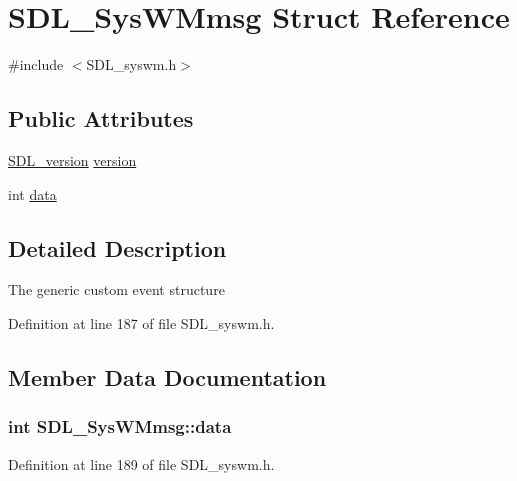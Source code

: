 \hypertarget{struct_s_d_l___sys_w_mmsg}{}\section{S\+D\+L\+\_\+\+Sys\+W\+Mmsg Struct Reference}
\label{struct_s_d_l___sys_w_mmsg}


{\ttfamily \#include $<$S\+D\+L\+\_\+syswm.\+h$>$}

\subsection*{Public Attributes}
\begin{DoxyCompactItemize}
\item 
\hyperlink{struct_s_d_l__version}{S\+D\+L\+\_\+version} \hyperlink{struct_s_d_l___sys_w_mmsg_a95f9aae58d18ee8fac556416b322a5fb}{version}
\item 
int \hyperlink{struct_s_d_l___sys_w_mmsg_ae2399a5ef24f5a1b39ad053c71ce5a43}{data}
\end{DoxyCompactItemize}


\subsection{Detailed Description}
The generic custom event structure 

Definition at line 187 of file S\+D\+L\+\_\+syswm.\+h.



\subsection{Member Data Documentation}
\hypertarget{struct_s_d_l___sys_w_mmsg_ae2399a5ef24f5a1b39ad053c71ce5a43}{}
\subsubsection[{data}]{\setlength{\rightskip}{0pt plus 5cm}int S\+D\+L\+\_\+\+Sys\+W\+Mmsg\+::data}\label{struct_s_d_l___sys_w_mmsg_ae2399a5ef24f5a1b39ad053c71ce5a43}


Definition at line 189 of file S\+D\+L\+\_\+syswm.\+h.

\hypertarget{struct_s_d_l___sys_w_mmsg_a95f9aae58d18ee8fac556416b322a5fb}{}
